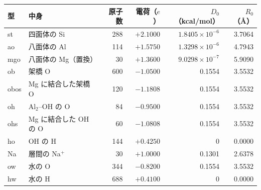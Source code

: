 \begin{tabular}{llrrrr}
\toprule
型 & 中身 & 原子数 & 電荷（$e$） & $D_0$（kcal/mol） & $R_0$（\AA） \\
\midrule
st & 四面体の Si & 288 & $+2.1000$ & $1.8405\times10^{-6}$ & 3.7064 \\
ao & 八面体の Al & 114 & $+1.5750$ & $1.3298\times10^{-6}$ & 4.7943 \\
mgo & 八面体の Mg（置換） & 30 & $+1.3600$ & $9.0298\times10^{-7}$ & 5.9090 \\
ob & 架橋 O & 600 & $-1.0500$ & 0.1554 & 3.5532 \\
obos & Mg に結合した架橋 O & 120 & $-1.1808$ & 0.1554 & 3.5532 \\
oh & Al$_2$--OH の O & 84 & $-0.9500$ & 0.1554 & 3.5532 \\
ohs & Mg に結合した OH の O & 60 & $-1.0808$ & 0.1554 & 3.5532 \\
ho & OH の H & 144 & $+0.4250$ & 0 & 0.0000 \\
Na & 層間の Na$^+$ & 30 & $+1.0000$ & 0.1301 & 2.6378 \\
ow & 水の O & 344 & $-0.8200$ & 0.1554 & 3.5532 \\
hw & 水の H & 688 & $+0.4100$ & 0 & 0.0000 \\
\bottomrule
\end{tabular}
